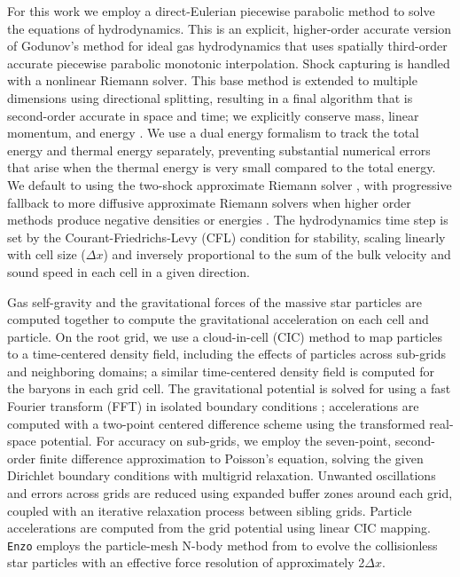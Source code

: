 \documentclass[12pt]{article} %
\begin{document}
For this work we employ a direct-Eulerian piecewise parabolic method \citep{ColellaWoodward1984, Bryan1995} to solve the equations of hydrodynamics. This is an explicit, higher-order accurate version of Godunov's method for ideal gas hydrodynamics that uses spatially third-order accurate piecewise parabolic monotonic interpolation. Shock capturing is handled with a nonlinear Riemann solver. This base method is extended to multiple dimensions using directional splitting, resulting in a final algorithm that is second-order accurate in space and time; we explicitly conserve mass, linear momentum, and energy \citep{Hawley1984, NormanWinkler1986}. We use a dual energy formalism to track the total energy and thermal energy separately, preventing substantial numerical errors that arise when the thermal energy is very small compared to the total energy. We default to using the two-shock approximate Riemann solver \citep{Toro1997}, with progressive fallback to more diffusive approximate Riemann solvers when higher order methods produce negative densities or energies \citep{LemasterStone2009}. 
The hydrodynamics time step is set by the Courant-Friedrichs-Levy (CFL) condition for stability, scaling linearly with cell size ($\Delta x$) and inversely proportional to the sum of the bulk velocity and sound speed in each cell in a given direction. 

Gas self-gravity and the gravitational forces of the massive star particles are computed together to compute the gravitational acceleration on each cell and particle. On the root grid, we use a cloud-in-cell (CIC) method \citep{HockneyEastwood1988} to map particles to a time-centered density field, including the effects of particles across sub-grids and neighboring domains; a similar time-centered density field is computed for the baryons in each grid cell. The gravitational potential is solved for using a fast Fourier transform (FFT) in isolated boundary conditions \citep{James1977}; accelerations are computed with a two-point centered difference scheme using the transformed real-space potential. For accuracy on sub-grids, we employ the seven-point, second-order finite difference approximation to Poisson's equation, solving the given Dirichlet boundary conditions with multigrid relaxation. Unwanted oscillations and errors across grids are reduced using expanded buffer zones around each grid, coupled with an iterative relaxation process between sibling grids. Particle accelerations are computed from the grid potential using linear CIC mapping. \texttt{Enzo} employs the particle-mesh N-body method from \cite{HockneyEastwood1988} to evolve the collisionless star particles with an effective force resolution of approximately 2$\Delta x$.
\end{document}

